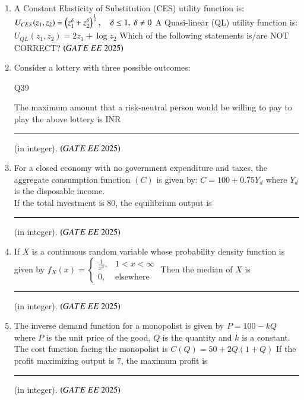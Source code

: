 \documentclass[journal,12pt,onecolumn]{IEEEtran}
\theoremstyle{remark}
\begin{document}
\begin{enumerate}
\item A Constant Elasticity of Substitution (CES) utility function is:
$
U_{CES}(z_1, z_2) = \left(z_1^{\delta} + z_2^{\delta}\right)^{\frac{1}{\delta}}, \quad \delta \leq 1,\; \delta \neq 0
$
A Quasi-linear (QL) utility function is:
$
U_{QL}(z_1, z_2) = 2z_1 + \log z_2
$
Which of the following statements is/are NOT CORRECT?
\hfill $\brak{GATE\ EE\ 2025}$
\begin{enumerate}
\end{enumerate}
\item Consider a lottery with three possible outcomes: \\
\begin{table}[H]
\centering

\caption{Q39}
\label{Q39}
\end{table}
The maximum amount that a risk-neutral person would be willing to pay to play the above lottery is INR \rule{2cm}{0.4pt} (in integer).
\hfill $\brak{GATE\ EE\ 2025}$

\item For a closed economy with no government expenditure and taxes, the aggregate consumption function $(C)$ is given by:
$
C = 100 + 0.75Y_d
$
where $Y_d$ is the disposable income. \\
If the total investment is 80, the equilibrium output is \rule{2cm}{0.4pt} (in integer).
\hfill $\brak{GATE\ EE\ 2025}$

\item If $X$ is a continuous random variable whose probability density function is given by
$
f_X(x) = 
\begin{cases}
\frac{1}{x^2}, & 1 < x < \infty \\
0, & \text{elsewhere}
\end{cases}
$
Then the median of $X$ is \rule{2cm}{0.4pt} (in integer).
\hfill $\brak{GATE\ EE\ 2025}$

\item The inverse demand function for a monopolist is given by
$
P = 100 - kQ
$
where $P$ is the unit price of the good, $Q$ is the quantity and $k$ is a constant. \\
The cost function facing the monopolist is
$
C(Q) = 50 + 2Q(1+Q)
$
If the profit maximizing output is $7$, the maximum profit is \rule{2cm}{0.4pt} (in integer).
\hfill $\brak{GATE\ EE\ 2025}$


\end{enumerate}
\end{document}
